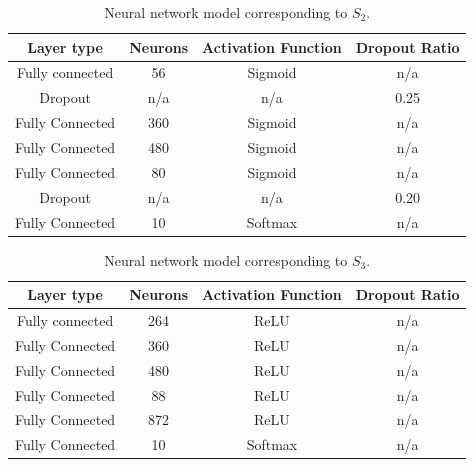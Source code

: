 \documentclass[journal]{IEEEtran}
\begin{document}
\begin{table}[!htb]
\begin{center}
\begin{tabular}{| c | c | c | c |}
\hline
Layer type & Neurons & Activation Function & Dropout Ratio \\
\hline
Fully connected & 56 & Sigmoid & n/a \\
Dropout & n/a & n/a & 0.25 \\
Fully Connected & 360 & Sigmoid & n/a\\
Fully Connected & 480 & Sigmoid & n/a\\
Fully Connected & 80 & Sigmoid & n/a\\
Dropout & n/a & n/a & 0.20\\
Fully Connected & 10 & Softmax & n/a\\
\hline
\end{tabular}
\end{center}
\caption{Neural network model corresponding to $S_2$.}
\label{table:neural_network_model_S2}
\end{table}

\begin{table}[!htb]
\begin{center}
\begin{tabular}{| c | c | c | c |}
\hline
Layer type & Neurons & Activation Function & Dropout Ratio \\
\hline
Fully connected & 264 & ReLU & n/a \\
Fully Connected & 360 & ReLU & n/a\\
Fully Connected & 480 & ReLU & n/a\\
Fully Connected & 88 & ReLU & n/a\\
Fully Connected & 872 & ReLU & n/a\\
Fully Connected & 10 & Softmax & n/a\\
\hline
\end{tabular}
\end{center}
\caption{Neural network model corresponding to $S_3$.}
\label{table:neural_network_model_S3}
\end{table}

\end{document}
